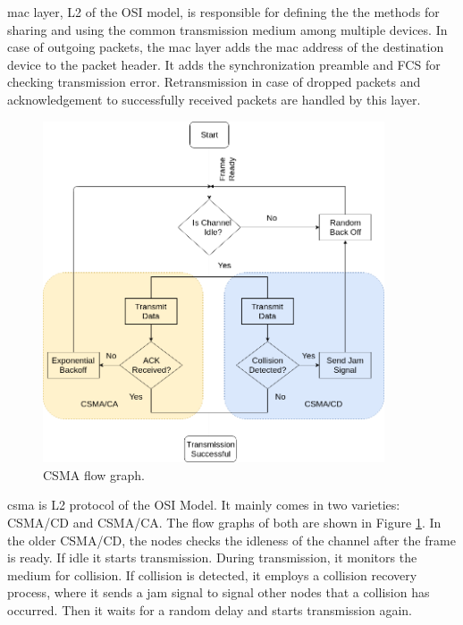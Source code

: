 \ac{mac} layer, \ac{L2} of the \ac{OSI} model, is responsible for defining the the methods for sharing and using the common transmission medium among multiple devices.
In case of outgoing packets, the \ac{mac} layer adds the \ac{mac} address of the destination device to the packet header.
It adds the synchronization preamble and \ac{FCS} for checking transmission error.
Retransmission in case of dropped packets and acknowledgement to successfully received packets are handled by this layer.\\

\begin{figure}[h!]
\centering
\includegraphics[width=0.9\textwidth]{Figure/CSMA.png}
\caption{CSMA flow graph.}
\label{Csma_flow}
\end{figure}

\ac{csma} is \ac{L2} protocol of the OSI Model. 
It mainly comes in two varieties: \ac{CSMA/CD}  and \ac{CSMA/CA}.
The flow graphs of both are shown in Figure \ref{Csma_flow}.
In the older \ac{CSMA/CD}, the nodes checks the idleness of the channel after the frame is ready.
If idle it starts transmission.
During transmission, it monitors the medium for collision.
If collision is detected, it employs a collision recovery process, where it sends a jam signal to signal other nodes that a collision has occurred.
Then it waits for a  random delay and starts transmission again.\\

